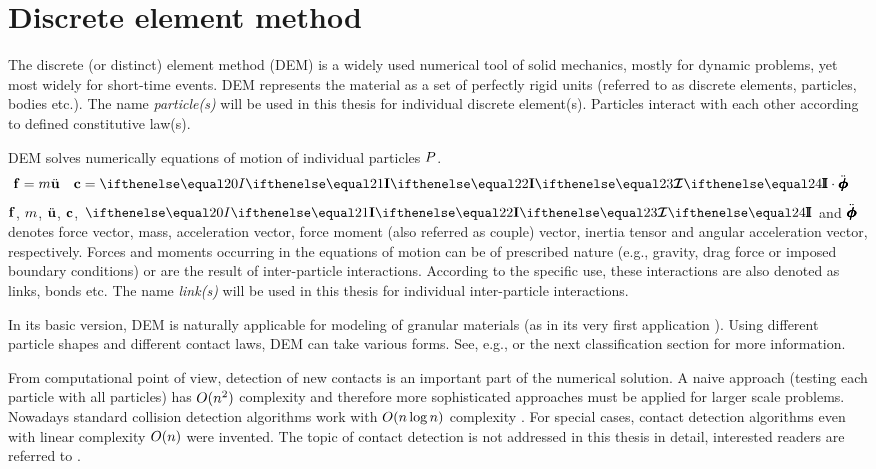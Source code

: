 \chapter{Discrete element method}\label{chapDem}

The discrete (or distinct) element method (DEM) is a widely used numerical tool of solid mechanics,
mostly for dynamic problems, yet most widely for short-time events.
DEM represents the material as a set of perfectly rigid units (referred to as discrete elements, particles, bodies etc.).
The name \emph{particle(s)} will be used in this thesis for individual discrete element(s).
Particles interact with each other according to defined constitutive law(s).

DEM solves numerically equations of motion of individual particles $P$.
\begin{align}
	\forceVector &= \mass \accelerationVector
	&
	\coupleVector &= \inertiaTensor \cdot \angularAccelerationVector
\end{align}
$\forceVector$, $m$, $\accelerationVector$, $\coupleVector$, $\inertiaTensor$ and $\angularAccelerationVector$
denotes
force vector, mass, acceleration vector, force moment (also referred as couple) vector, inertia tensor and angular acceleration vector, respectively.
Forces and moments occurring in the equations of motion can be of prescribed nature (e.g., gravity, drag force or imposed boundary conditions) or are the result of inter-particle interactions.
According to the specific use, these interactions are also denoted as links, bonds etc.
The name \emph{link(s)} will be used in this thesis for individual inter-particle interactions.

In its basic version, DEM is naturally applicable for modeling of granular materials (as in its very first application \cite{CundallStrack1979a}).
Using different particle shapes and different contact laws, DEM can take various forms.
See, e.g., \cite{yade2015} or the next classification section for more information.

From computational point of view, detection of new contacts is an important part of the numerical solution.
A naive approach (testing each particle with all particles) has $O(n^2)$ complexity and therefore more sophisticated approaches must be applied for larger scale problems.
Nowadays standard collision detection algorithms work with $O(n\log n)$ complexity \cite{yade2015}.
For special cases, contact detection algorithms even with linear complexity $O(n)$ were invented.
The topic of contact detection is not addressed in this thesis in detail,
interested readers are referred to \cite{yade2015,MunjizaAndrews1998a}.

